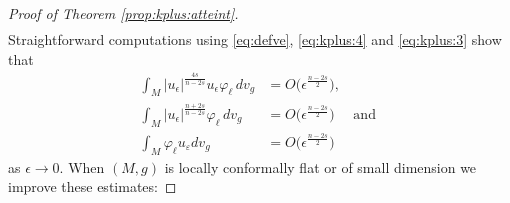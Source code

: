 \documentclass[10pt]{amsart}
\numberwithin{equation}{section}
\def\ep{{\varepsilon}}
\newcommand{\ve}{\varepsilon}
\newcommand{\vp}{\varphi}
\def \ep{\epsilon}
\theoremstyle{plain}
\theoremstyle{remark}
\begin{document}
\begin{proof}[Proof of Theorem \ref{prop:kplus:atteint}]
\begin{equation}
\begin{aligned}
 \end{aligned} 
 \end{equation}
Straightforward computations using \eqref{eq:defve}, \eqref{eq:kplus:4}  and \eqref{eq:kplus:3} show that
\begin{equation} \label{eq:kplus:5}
\begin{aligned}
\int_{M} |u_{\ep}|^{\frac{4s}{n-2s}} u_\ep \varphi_{\ell}\, dv_g & = O \big(\ep^{\frac{n-2s}{2}} \big) , \\
\int_{M} |u_{\ep}|^{\frac{n+2s}{n-2s}}\varphi_{\ell}\, dv_g & = O \big(\ep^{\frac{n-2s}{2}} \big) \quad \text{ and } \\ 
\int_{M} \vp_\ell u_\ve dv_g & = O \big(\ep^{\frac{n-2s}{2}} \big) 
\end{aligned}
\end{equation}
as $\ep \to 0$. When $(M,g)$ is locally conformally flat or of small dimension we improve these estimates: 


\end{proof}
\end{document}
